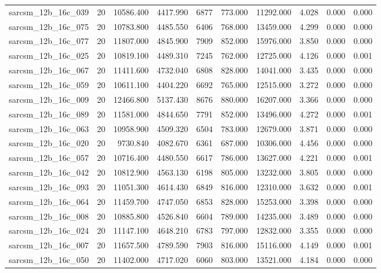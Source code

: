 \begin{tabular}{lrrrrrrrrr}
sarcsm\_12b\_16c\_039 & 20 & 10586.400 & 4417.990 & 6877 & 773.000 & 11292.000 & 4.028 & 0.000 & 0.000 \\
sarcsm\_12b\_16c\_075 & 20 & 10783.800 & 4485.550 & 6406 & 768.000 & 13459.000 & 4.299 & 0.000 & 0.000 \\
sarcsm\_12b\_16c\_077 & 20 & 11807.000 & 4845.900 & 7909 & 852.000 & 15976.000 & 3.850 & 0.000 & 0.000 \\
sarcsm\_12b\_16c\_025 & 20 & 10819.100 & 4489.310 & 7245 & 762.000 & 12725.000 & 4.126 & 0.000 & 0.001 \\
sarcsm\_12b\_16c\_067 & 20 & 11411.600 & 4732.040 & 6808 & 828.000 & 14041.000 & 3.435 & 0.000 & 0.000 \\
sarcsm\_12b\_16c\_059 & 20 & 10611.100 & 4404.220 & 6692 & 765.000 & 12515.000 & 3.272 & 0.000 & 0.000 \\
sarcsm\_12b\_16c\_009 & 20 & 12466.800 & 5137.430 & 8676 & 880.000 & 16207.000 & 3.366 & 0.000 & 0.000 \\
sarcsm\_12b\_16c\_089 & 20 & 11581.000 & 4844.650 & 7791 & 852.000 & 13496.000 & 4.272 & 0.000 & 0.001 \\
sarcsm\_12b\_16c\_063 & 20 & 10958.900 & 4509.320 & 6504 & 783.000 & 12679.000 & 3.871 & 0.000 & 0.000 \\
sarcsm\_12b\_16c\_020 & 20 & 9730.840 & 4082.670 & 6361 & 687.000 & 10306.000 & 4.456 & 0.000 & 0.000 \\
sarcsm\_12b\_16c\_057 & 20 & 10716.400 & 4480.550 & 6617 & 786.000 & 13627.000 & 4.221 & 0.000 & 0.001 \\
sarcsm\_12b\_16c\_042 & 20 & 10812.900 & 4563.130 & 6198 & 805.000 & 13232.000 & 3.805 & 0.000 & 0.000 \\
sarcsm\_12b\_16c\_093 & 20 & 11051.300 & 4614.430 & 6849 & 816.000 & 12310.000 & 3.632 & 0.000 & 0.001 \\
sarcsm\_12b\_16c\_064 & 20 & 11459.700 & 4747.050 & 6853 & 828.000 & 15253.000 & 3.398 & 0.000 & 0.000 \\
sarcsm\_12b\_16c\_008 & 20 & 10885.800 & 4526.840 & 6604 & 789.000 & 14235.000 & 3.489 & 0.000 & 0.000 \\
sarcsm\_12b\_16c\_024 & 20 & 11147.100 & 4648.210 & 6783 & 797.000 & 12832.000 & 3.355 & 0.000 & 0.000 \\
sarcsm\_12b\_16c\_007 & 20 & 11657.500 & 4789.590 & 7903 & 816.000 & 15116.000 & 4.149 & 0.000 & 0.001 \\
sarcsm\_12b\_16c\_050 & 20 & 11402.000 & 4717.020 & 6060 & 803.000 & 13521.000 & 4.184 & 0.000 & 0.000 \\

\end{tabular}
